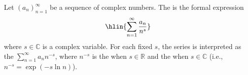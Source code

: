 \begin{definition}
\label{definition:dirichlet_series}
Let $(a_n)_{n=1}^\infty$ be a sequence of complex numbers. The  is the formal expression
$$\hlin{\sum_{n=1}^\infty \frac{a_n}{n^s}}$$
where $s \in \mathbb{C}$ is a complex variable. For each fixed $s$, the series is interpreted as the  $\sum_{n=1}^\infty a_n n^{-s}$, where $n^{-s}$ is the  when $s \in \mathbb{R}$ and the  when $s \in \mathbb{C}$ (i.e., $n^{-s} = \exp(-s \ln n)$).
\end{definition}